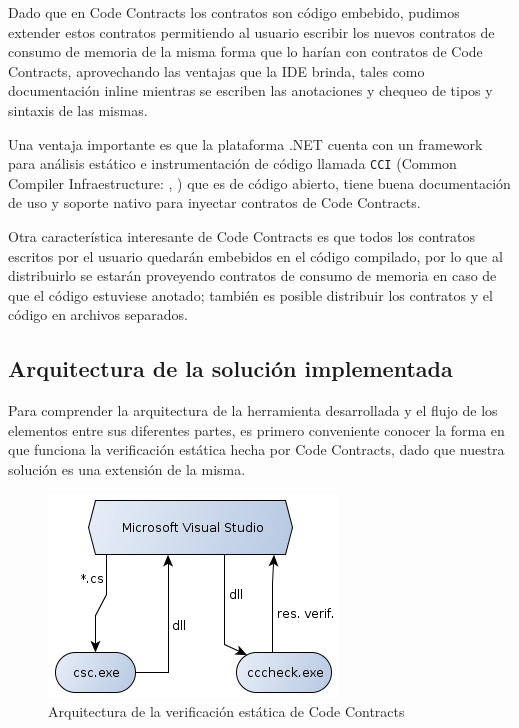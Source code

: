 \documentclass[12pt,a4paper]{article}
\newcommand\mono[1]{\texttt{#1}}
\begin{document}
			Dado que en Code Contracts los contratos son código embebido, pudimos extender estos contratos permitiendo al usuario escribir los nuevos contratos de consumo de memoria de la misma forma que lo harían con contratos de Code Contracts, aprovechando las ventajas que la IDE brinda, tales como documentación inline mientras se escriben las anotaciones y chequeo de tipos y sintaxis de las mismas.

			Una ventaja importante es que la plataforma .NET cuenta con un framework para análisis estático e instrumentación de código llamada \mono{CCI} (Common Compiler Infraestructure: \cite{CCImeta}, \cite{CCIast}) que es de código abierto, tiene buena documentación de uso y soporte nativo para inyectar contratos de Code Contracts.

			Otra característica interesante de Code Contracts es que todos los contratos escritos por el usuario quedarán embebidos en el código compilado, por lo que al distribuirlo se estarán proveyendo contratos de consumo de memoria en caso de que el código estuviese anotado; también es posible distribuir los contratos y el código en archivos separados.
		\subsection{Arquitectura de la solución implementada}
			Para comprender la arquitectura de la herramienta desarrollada y el flujo de los elementos entre sus diferentes partes, es primero conveniente conocer la forma en que funciona la verificación estática hecha por Code Contracts, dado que nuestra solución es una extensión de la misma.

			\begin{figure}[htb]
			\begin{center}
			\includegraphics[scale=0.5]{arq_cc.png}
			\end{center}
			\caption{Arquitectura de la verificación estática de Code Contracts}
			\label{arqcc}
			\end{figure}
\end{document}
